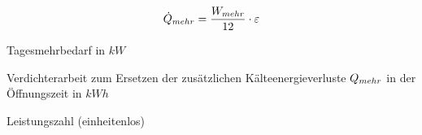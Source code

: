 \begin{equation}
	\pmehr = \frac{\lmehr}{12} \cdot \epsilon
\label{spmehr}
\end{equation}

\begin{description}[\dth]

	\item[$\pmehr$] Tagesmehrbedarf in $kW$
	\item[$\lmehr$] Verdichterarbeit zum Ersetzen der zus\"atzlichen
	K\"alteenergieverluste $Q_{mehr}$ in der \"Offnungszeit in $kWh$
	\item[$\epsilon$] Leistungszahl (einheitenlos)

\end{description}
\vspace{0.5cm}


